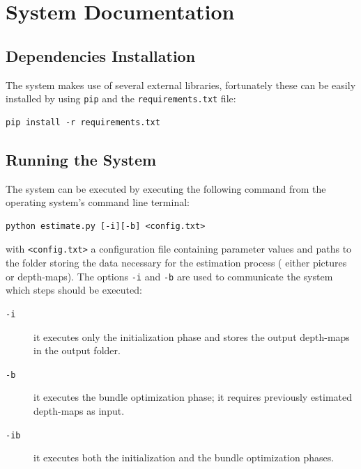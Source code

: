 \documentclass[notitlepage,english]{hgbreport}
\begin{document}
\chapter{System Documentation}
\newcommand{\ComputeEnergy}{\texttt{compute\_energy}}
\newcommand{\Estimate}{\texttt{estimate}}
\newcommand{\Lbp}{\texttt{lbp}}
\newcommand{\Utils}{\texttt{utils}}
\newcommand{\Params}{\texttt{params}}

\section{Dependencies Installation}
The system makes use of several external libraries, fortunately these can be easily installed by using \texttt{pip} and the \texttt{requirements.txt} file:
\begin{lstlisting}[stepnumber=0]
pip install -r requirements.txt
\end{lstlisting}

\section{Running the System}
The system can be executed by executing the following command from the operating system's command line terminal:
\begin{lstlisting}[stepnumber=0]
	python estimate.py [-i][-b] <config.txt>
\end{lstlisting}
with \texttt{<config.txt>} a configuration file containing parameter values and paths to the folder storing the data necessary for the estimation process (\ie{} either pictures or depth-maps).
The options \texttt{-i} and \texttt{-b} are used to communicate the system which steps should be executed:
\begin{description}
	\item[\texttt{-i}] it executes only the initialization phase and stores the output depth-maps in the output folder.
	\item[\texttt{-b}] it executes the bundle optimization phase; it requires previously estimated depth-maps as input. 
	\item[\texttt{-ib}] it executes both the initialization and the bundle optimization phases.
\end{description}
\end{document}

